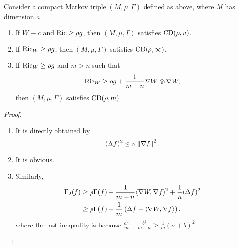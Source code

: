 \begin{cor}
    Consider a compact Markov triple $(M,\mu,\Gamma)$ defined as above, where $M$ has dimension $n$.
    \begin{enumerate}[label=(\arabic{*})]
        \item If $W \equiv c$ and $\operatorname{Ric} \geq \rho g$, then $(M,\mu,\Gamma)$ satisfies $\operatorname{CD}(\rho,n)$.
        \item If $\operatorname{Ric}_W \geq \rho g$, then $(M,\mu,\Gamma)$ satisfies $\operatorname{CD}(\rho,\infty)$.
        \item If $\operatorname{Ric}_W \geq \rho g$ and $m > n$ such that
        \begin{equation*}
            \operatorname{Ric}_W \geq \rho g + \frac{1}{m - n} \nabla W \otimes \nabla W,
        \end{equation*}
        then $(M,\mu,\Gamma)$ satisfies $\operatorname{CD}(\rho,m)$.
    \end{enumerate}
\end{cor}
\begin{proof}
    \begin{enumerate}[label=(\arabic{*})]
        \item It is directly obtained by
        \begin{equation*}
            (\Delta f)^2 \leq n \left\lVert\nabla f\right\lVert^2.
        \end{equation*}

        \item It is obvious.

        \item Similarly,
        \begin{align*}
            \Gamma_2(f) &\geq \rho \Gamma(f)+\frac{1}{m-n}\langle\nabla W, \nabla f\rangle^2+\frac{1}{n}(\Delta f)^2 \\
            &\geq \rho \Gamma(f)+\frac{1}{m}\left(\Delta f - \langle\nabla W, \nabla f\rangle\right),
        \end{align*}
        where the last inequality is because $\frac{a^2}{m}+\frac{b^2}{m-n} \geq \frac{1}{m}(a+b)^2$. \qedhere
    \end{enumerate}
\end{proof}